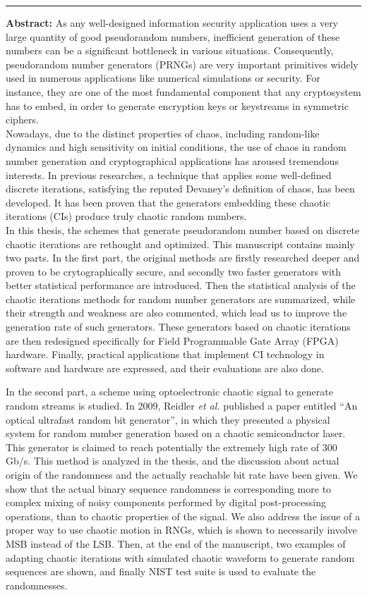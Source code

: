 \documentclass[french,book,nopubpage,nodocumentinfo]{upmethodology-document}
\renewcommand{\headrulewidth}{1.0pt}
\renewcommand{\headrulewidth}{0pt}
\newenvironment{vcenterpage}
{\newpage\vspace*{\fill}\thispagestyle{empty}\renewcommand{\headrulewidth}{0pt}}
{\vspace*{\fill}}
\begin{document}
\begin{vcenterpage}
\noindent\rule[2pt]{\textwidth}{0.5pt}
{\large\textbf{Abstract:}}
As any well-designed information security application uses a very large quantity of good pseudorandom numbers, inefficient generation of these numbers can be a significant bottleneck in various situations. Consequently, pseudorandom number generators (PRNGs) are very important primitives widely used in numerous applications like numerical simulations or security. For instance, they are one of the most fundamental component that any cryptosystem has to embed, in order to generate encryption keys or keystreams in symmetric ciphers.\\
Nowadays, due to the distinct properties of chaos, including random-like dynamics and high sensitivity on initial conditions, the use of chaos in random number generation and cryptographical applications has aroused tremendous interests. In previous researches, a technique that applies some well-defined discrete iterations, satisfying the reputed Devaney's definition of chaos, has been developed. It has been proven that the generators embedding these chaotic iterations (CIs) produce truly chaotic random numbers.\\
In this thesis, the schemes that generate pseudorandom number based on discrete chaotic iterations are rethought and optimized.
This manuscript contains mainly two parts. 
In the first part, the original methods are firstly researched deeper and proven to be crytographically secure, and secondly two faster generators with better statistical performance are introduced. Then the statistical analysis of the chaotic iterations methods for random number generators are summarized, while their strength and weakness are also commented, which lead us to improve the generation rate of such generators.  These generators based on chaotic iterations are then redesigned specifically for Field Programmable Gate Array (FPGA) hardware. Finally, practical applications that implement CI technology in software and hardware are expressed, and their evaluations are also done.

In the second part, a scheme using optoelectronic chaotic signal to generate random streams is studied. In 2009, Reidler \emph{et al.} published a paper entitled ``An optical ultrafast random bit generator'', in which they presented a physical system for random number generation based on a chaotic semiconductor laser. This generator is claimed to reach potentially the extremely high rate of 300 Gb/s. This method is analyzed in the thesis, and the discussion about actual origin of the randomness and the actually reachable bit rate have been given. We show that the actual binary sequence randomness is corresponding more to complex mixing of noisy components performed by digital post-processing operations, than to chaotic properties of the signal. We also address the issue of a proper way to use chaotic motion in RNGs, which is shown to necessarily involve MSB instead of the LSB. Then, at the end of the manuscript, two examples of adapting chaotic iterations with simulated chaotic waveform to generate random sequences are shown, 
and finally NIST test suite is used 
to evaluate the randomnesses.


\end{vcenterpage}
\end{document}
